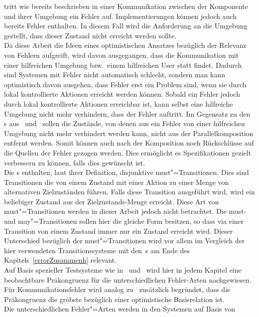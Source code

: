 tritt wie bereits beschrieben in einer Kommunikation zwischen der Komponente
und ihrer Umgebung ein Fehler auf. Implementierungen können jedoch auch bereits
Fehler enthalten. In diesem Fall wird die Anforderung an die Umgebung gestellt,
dass dieser Zustand nicht erreicht werden sollte.\\
Da diese Arbeit die Ideen eines optimistischen Ansatzes bezüglich der Relevanz
von Fehlern aufgreift, wird davon ausgegangen, dass die Kommunikation
mit einer hilfreichen Umgebung bzw.\ einem hilfreichen User statt findet.
Dadurch sind Systemen mit Fehler nicht automatisch schlecht, sondern man kann
optimistisch davon ausgehen, dass Fehler erst ein Problem sind, wenn sie durch
lokal kontrollierte Aktionen erreicht werden können. Sobald ein Fehler jedoch
durch lokal kontrollierte Aktionen erreichbar ist, kann
selbst eine hilfreiche Umgebung nicht mehr verhindern, dass der Fehler
auftritt. Im Gegensatz zu den \MIA{}s aus~\cite{Luttgen2013MIA1}
und~\cite{Vogler2016MIA3} sollen die Zustände, von denen aus ein Fehler von
einer hilfreichen Umgebung nicht mehr verhindert werden kann, nicht aus der
Parallelkomposition entfernt werden. Somit können auch nach der Komposition
noch Rückschlüsse auf die Quellen der Fehler gezogen werden. Dies ermöglicht
es Spezifikationen gezielt verbessern zu können, falls dies gewünscht ist.\\
Die \MIA{}s enthalten, laut ihrer Definition, disjunktive must"=Transitionen.
Dies sind Transitionen die von einem Zustand mit einer Aktion zu einer Menge
von alternativen Zielzuständen führen. Falls diese Transition ausgeführt wird,
wird ein beliebiger Zustand aus der Zielzustands-Menge erreicht. Diese Art von
must"=Transitionen werden in dieser Arbeit jedoch nicht betrachtet. Die must-
und may"=Transitionen sollen hier die gleiche Form besitzen, so dass via einer
Transition von einem Zustand immer nur ein Zustand erreicht wird. Dieser
Unterschied bezüglich der must"=Transitionen wird vor allem im Vergleich der
hier verwendeten Transitionssysteme mit den~\MIA{}s am Ende des
Kapitels~\ref{errorZusammenh} relevant.\\
Auf Basis spezieller Testsysteme wie in~\cite{Vogler2015FailSem}
und~\cite{Vogler2017dMTS} wird hier in jedem Kapitel eine beobachtbare
Präkongruenz für die unterschiedlichen Fehler-Arten nachgewiesen. Für
Kommunikationsfehler wird analog zu~\cite{Schinko2016BA} zusätzlich begründet,
dass die Präkongruenz die gröbste bezüglich einer optimistische
Basisrelation ist.\\
Die unterschiedlichen Fehler"=Arten werden in den Systemen auf Basis von
